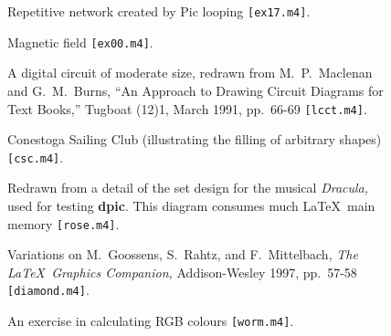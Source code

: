 \documentclass[11pt]{article}
\newcommand{\src}[1]{{\tt [#1]}}
\newcommand{\makepic}{\box\graph} %
\begin{document}
  \begin{figure}[h!t]
    \centerline{ \makepic}
    \caption{Repetitive network created by Pic looping
    \src{ex17.m4}.}
  \end{figure}

  \begin{figure}[h!t]
    \centerline{ \makepic}
    \caption{Magnetic field
    \src{ex00.m4}.}
  \end{figure}

  \begin{landscape}
  \begin{figure}[h!t]
    \centerline{ \makepic}
    \caption{A digital circuit of moderate size,
      redrawn from M.~P.~Maclenan and G.~M.~Burns,
      ``An Approach to Drawing Circuit Diagrams for Text Books,''
      Tugboat (12)1, March 1991, pp.\ 66-69
    \src{lcct.m4}.}
  \end{figure}
  \end{landscape}

  \begin{figure}[h!t]
    \centerline{ \makepic}
    \caption{Conestoga Sailing Club (illustrating the filling of arbitrary
      shapes)
    \src{csc.m4}.}
  \end{figure}

  \begin{figure}[h!t]
    \centerline{ \makepic}
    \caption{Redrawn from a detail of the set design for the musical
      {\it Dracula,} used for testing {\bf dpic}.  This diagram consumes much
      \LaTeX\ main memory
    \src{rose.m4}.}
  \end{figure}
  \clearpage

  \begin{figure}[h!t]
    \centerline{ \makepic}
    \caption{Variations on M.~Goossens, S.~Rahtz, and F.~Mittelbach,
      {\em The \LaTeX\ Graphics Companion,} Addison-Wesley 1997, pp.\ 57-58
    \src{diamond.m4}.}
  \end{figure}

  \begin{figure}[h!t]
    \centerline{ \makepic}
    \caption{An exercise in calculating RGB colours
    \src{worm.m4}.}
  \end{figure}
  \clearpage

\end{document}
